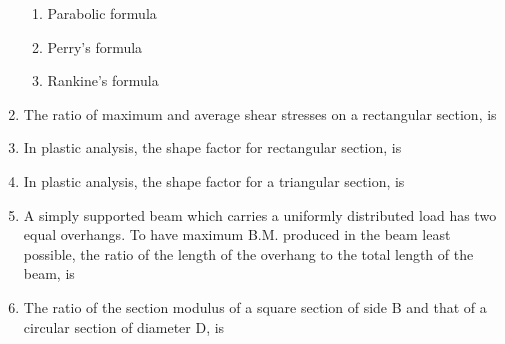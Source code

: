 \documentclass[11pt,a4paper]{article}
\begin{document}
\begin{enumerate}
\begin{enumerate}[label=\Alph*.]
\item{Parabolic formula}
\item{Perry's formula}
\item{Rankine's formula}
\end{enumerate}
\item{The ratio of maximum and average shear stresses on a rectangular section, is}
\\
\item{In plastic analysis, the shape factor for rectangular section, is}
\\
\item{In plastic analysis, the shape factor for a triangular section, is}
\\
\item{A simply supported beam which carries a uniformly distributed load has two equal overhangs. To have maximum B.M. produced in the beam least possible, the ratio of the length of the overhang to the total length of the beam, is}
\\
\item{The ratio of the section modulus of a square section of side B and that of a circular section of diameter D, is}

\end{enumerate}
\end{document}

